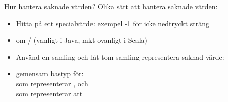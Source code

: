 

\ifkompendium\else




\begin{Slide}{Hur hantera saknade värden?}\SlideFontSmall
Olika sätt att hantera saknade värden:
\begin{itemize}
\item Hitta på ett specialvärde: exempel -1 för icke nedtryckt sträng
\item {} om / (vanligt i Java, mkt ovanligt i Scala) 
\item Använd en samling och låt tom samling representera saknad värde: \\

\item {} gemensam bastyp för: \\
   som representerar , och \\  som representerar att 
\end{itemize}
\end{Slide}

